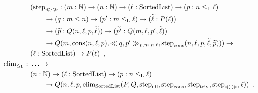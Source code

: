 \documentclass[orivec,envcountsame, ,envcountsect]{llncs}
\begin{document}
\begin{example}
\begin{align*}
                     & (\stepind{\consLessbare} : (m : \Nat) \to (n : \Nat) \to (\ell : \SortedList) \to (p : n \lessList \ell) \\
                     & \qquad \to (q : m \leq n) \to (p' : m \lessList \ell) \to
                     (\stepindarg{\ell} : P(\ell)) \\ 
                     & \qquad \to (\stepindarg{p} : Q(n, \ell,p, \stepindarg{\ell}))
                     \to (\stepindarg{p'} : Q(m, \ell, p', \stepindarg{\ell})) \\
                     & \qquad \to Q(m,\consList{n}{\ell}{p}, \consLess{m}{n}{\ell}{p}{q}{p'}, \stepind{\consListbare}(n, \ell, p, \stepindarg{\ell}, \stepindarg{p}))) \to \\
                     & (\ell : \SortedList) \to P(\ell) \enspace , \\
%
  \elim_{\lessList} :\ & \ldots \to \\
                     & (n : \Nat) \to (\ell : \SortedList) \to (p : n \lessList \ell) \\
                     & \qquad \to Q(n, \ell, p, \elim_{\SortedList}(P, Q, \stepind{\nilList}, \stepind{\consListbare},  \stepind{\nilLess{}}, \stepind{\consLessbare}, \ell)) \enspace .
  \end{align*}
 \end{example}
\end{document}
